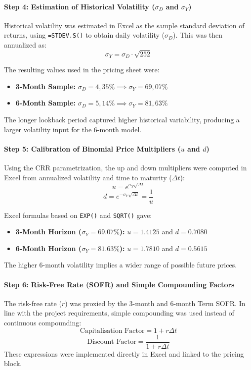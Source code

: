\documentclass{report}
\begin{document}
\paragraph{Step 4: Estimation of Historical Volatility ($\sigma_D$ and $\sigma_Y$)}
Historical volatility was estimated in Excel as the sample standard deviation of returns, using \texttt{=STDEV.S()} to obtain daily volatility ($\sigma_D$). This was then annualized as:
$$ \sigma_Y = \sigma_D \cdot \sqrt{252} $$

The resulting values used in the pricing sheet were:
\begin{itemize}
    \item \textbf{3-Month Sample:} $\sigma_D = 4,35\% \implies \sigma_Y = 69,07\%$
    \item \textbf{6-Month Sample:} $\sigma_D = 5,14\% \implies \sigma_Y = 81,63\%$
\end{itemize}

The longer lookback period captured higher historical variability, producing a larger volatility input for the 6-month model.

\paragraph{Step 5: Calibration of Binomial Price Multipliers ($u$ and $d$)}
Using the CRR parametrization, the up and down multipliers were computed in Excel from annualized volatility and time to maturity ($\Delta t$):
$$ u = e^{\sigma_Y \sqrt{\Delta t}} $$
$$ d = e^{-\sigma_Y \sqrt{\Delta t}} = \frac{1}{u} $$

Excel formulas based on \texttt{EXP()} and \texttt{SQRT()} gave:
\begin{itemize}
    \item \textbf{3-Month Horizon ($\sigma_Y = 69.07\%$):} $u = 1.4125$ and $d = 0.7080$
    \item \textbf{6-Month Horizon ($\sigma_Y = 81.63\%$):} $u = 1.7810$ and $d = 0.5615$
\end{itemize}

The higher 6-month volatility implies a wider range of possible future prices.

\paragraph{Step 6: Risk-Free Rate (SOFR) and Simple Compounding Factors}
The risk-free rate ($r$) was proxied by the 3-month and 6-month Term SOFR. In line with the project requirements, simple compounding was used instead of continuous compounding:
$$ \text{Capitalisation Factor} = 1 + r \Delta t $$
$$ \text{Discount Factor} = \frac{1}{1 + r \Delta t} $$
These expressions were implemented directly in Excel and linked to the pricing block.
\end{document}
